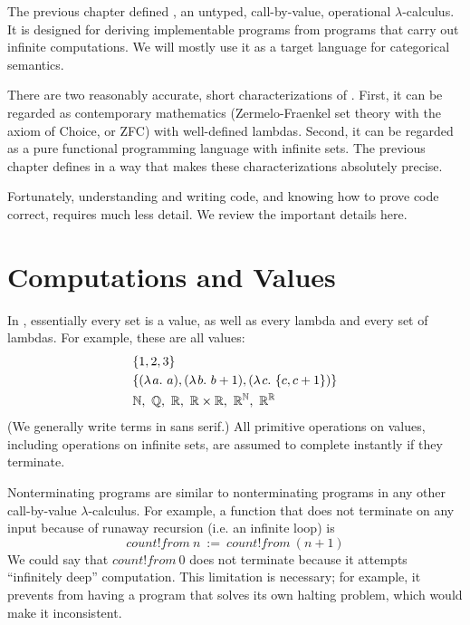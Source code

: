 
The previous chapter defined \lzfclang, an untyped, call-by-value, operational $\lambda$-calculus.
It is designed for deriving implementable programs from programs that carry out infinite computations.
We will mostly use it as a target language for categorical semantics.

There are two reasonably accurate, short characterizations of \lzfclang.
First, it can be regarded as contemporary mathematics (Zermelo-Fraenkel set theory with the axiom of Choice, or ZFC) with well-defined lambdas.
Second, it can be regarded as a pure functional programming language with infinite sets.
The previous chapter defines \lzfclang in a way that makes these characterizations absolutely precise.

Fortunately, understanding and writing \lzfclang code, and knowing how to prove \lzfclang code correct, requires much less detail.
We review the important details here.

\section{Computations and Values}

In \lzfclang, essentially every set is a value, as well as every lambda and every set of lambdas.
For example, these are all \lzfclang values:
\begin{equation}
\begin{aligned}
	&\{{1,2,3}\} \\
	&\{{(\lambda\mspace{2mu}{a}\ldotp\, a), (\lambda\mspace{2mu}{b}\ldotp\, b+1), (\lambda\mspace{2mu}{c}\ldotp\,\{{c,c+1}\})}\} \\
	&\mathbb{N},\ \mathbb{Q},\ \mathbb{R},\ \mathbb{R} \times \mathbb{R},\ \mathbb{R}^{\mathbb{N}},\ \mathbb{R}^{\mathbb{R}}
\end{aligned}
\end{equation}
(We generally write \lzfclang terms in \textsf{sans serif}.)
All primitive operations on values, including operations on infinite sets, are assumed to complete instantly if they terminate.

Nonterminating \lzfclang programs are similar to nonterminating programs in any other call-by-value $\lambda$-calculus.
For example, a function that does not terminate on any input because of runaway recursion (i.e. an infinite loop) is
\begin{equation}
	count!from~n\ :=\ count!from~(n+1)
\end{equation}
We could say that $count!from~0$ does not terminate because it attempts ``infinitely deep'' computation.
This limitation is necessary; for example, it prevents \lzfclang from having a program that solves its own halting problem, which would make it inconsistent.

